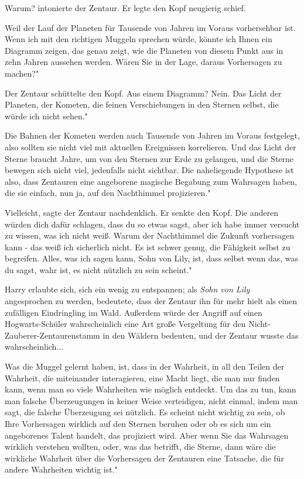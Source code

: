\glqq Warum?\grqq{} intonierte der Zentaur. Er legte den Kopf neugierig schief.

\glqq Weil der Lauf der Planeten für Tausende von Jahren im Voraus vorhersehbar
ist. Wenn ich mit den richtigen Muggeln sprechen würde, könnte ich Ihnen ein
Diagramm zeigen, das genau zeigt, wie die Planeten von diesem Punkt aus in zehn
Jahren aussehen werden. Wären Sie in der Lage, daraus Vorhersagen zu machen?"

Der Zentaur schüttelte den Kopf. \glqq Aus einem Diagramm? Nein. Das Licht der
Planeten, der Kometen, die feinen Verschiebungen in den Sternen selbst, die
würde ich nicht sehen."

\glqq Die Bahnen der Kometen werden auch Tausende von Jahren im Voraus
festgelegt, also sollten sie nicht viel mit aktuellen Ereignissen korrelieren.
Und das Licht der Sterne braucht Jahre, um von den Sternen zur Erde zu gelangen,
und die Sterne bewegen sich nicht viel, jedenfalls nicht sichtbar. Die
naheliegende Hypothese ist also, dass Zentauren eine angeborene magische
Begabung zum Wahrsagen haben, die sie einfach, nun ja, auf den Nachthimmel
projizieren."

\glqq Vielleicht\grqq{}, sagte der Zentaur nachdenklich. Er senkte den Kopf.
\glqq Die anderen würden dich dafür schlagen, dass du so etwas sagst, aber ich
habe immer versucht zu wissen, was ich nicht weiß. Warum der Nachthimmel die
Zukunft vorhersagen kann - das weiß ich sicherlich nicht. Es ist schwer genug,
die Fähigkeit selbst zu begreifen. Alles, was ich sagen kann, Sohn von Lily,
ist, dass selbst wenn das, was du sagst, wahr ist, es nicht nützlich zu sein
scheint."

Harry erlaubte sich, sich ein wenig zu entspannen; als\emph{ \glqq Sohn von
Lily\grqq{} } angesprochen zu werden, bedeutete, dass der Zentaur ihn für mehr
hielt als einen zufälligen Eindringling im Wald. Außerdem würde der Angriff auf
einen Hogwarts-Schüler wahrscheinlich eine Art große Vergeltung für den
Nicht-Zauberer-Zentaurenstamm in den Wäldern bedeuten, und der Zentaur wusste
das wahrscheinlich...

\glqq Was die Muggel gelernt haben, ist, dass in der Wahrheit, in all den Teilen
der Wahrheit, die miteinander interagieren, eine Macht liegt, die man nur finden
kann, wenn man so viele Wahrheiten wie möglich entdeckt. Um das zu tun, kann man
falsche Überzeugungen in keiner Weise verteidigen, nicht einmal, indem man sagt,
die falsche Überzeugung sei nützlich. Es scheint nicht wichtig zu sein, ob Ihre
Vorhersagen wirklich auf den Sternen beruhen oder ob es sich um ein angeborenes
Talent handelt, das projiziert wird. Aber wenn Sie das Wahrsagen wirklich
verstehen wollten, oder, was das betrifft, die Sterne, dann wäre die wirkliche
Wahrheit über die Vorhersagen der Zentauren eine Tatsache, die für andere
Wahrheiten wichtig ist."


